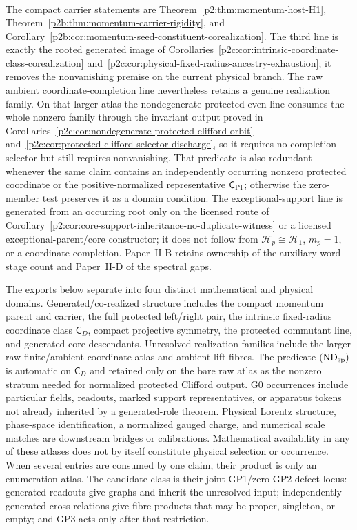 \documentclass[12pt,a4paper]{article}
\begin{document}
\begin{remark}
\[\begin{gathered}
\end{gathered}
\]
The compact carrier statements are Theorem~\ref{p2:thm:momentum-host-H1},
Theorem~\ref{p2b:thm:momentum-carrier-rigidity}, and
Corollary~\ref{p2b:cor:momentum-seed-constituent-corealization}.  The third
line is exactly the rooted generated image of
Corollaries~\ref{p2c:cor:intrinsic-coordinate-class-corealization}
and~\ref{p2c:cor:physical-fixed-radius-ancestry-exhaustion}; it removes the
nonvanishing premise on the current physical branch.  The raw ambient
coordinate-completion line nevertheless retains a genuine realization family.
On that larger atlas the nondegenerate protected-even line consumes the whole
nonzero family through the invariant output proved in
Corollaries~\ref{p2c:cor:nondegenerate-protected-clifford-orbit}
and~\ref{p2c:cor:protected-clifford-selector-discharge}, so it requires no
completion selector but still requires nonvanishing.  That predicate is also
redundant whenever the same claim contains an independently occurring nonzero
protected coordinate or the positive-normalized representative
\(\mathsf C_{\rm PI}\); otherwise the zero-member test preserves it as a
domain condition.  The exceptional-support line is generated from an occurring
root only on the licensed route of
Corollary~\ref{p2:cor:core-support-inheritance-no-duplicate-witness} or a
licensed exceptional-parent/core constructor; it does not follow from
\(\mathcal H_p\cong\mathcal H_1\), \(m_p=1\), or a coordinate completion.
Paper~II-B retains ownership of the auxiliary word-stage count and Paper~II-D
of the spectral gaps.
\end{remark}

\begin{remark}
The exports below separate into four distinct mathematical and
physical domains.  Generated/co-realized structure includes the compact momentum
parent and carrier, the full protected left/right pair, the intrinsic
fixed-radius coordinate class \(\mathsf C_D\), compact projective symmetry,
the protected commutant line, and generated core descendants.  Unresolved
realization families include the larger raw finite/ambient coordinate atlas
and ambient-lift fibres.  The predicate \((\mathrm{ND}_{\rm sp})\) is automatic
on \(\mathsf C_D\) and retained only on the bare raw atlas as the nonzero
stratum needed for normalized protected Clifford output.  G0 occurrences
include particular fields, readouts, marked support representatives, or
apparatus tokens not already inherited by a generated-role theorem.  Physical
Lorentz structure, phase-space identification, a normalized gauged charge, and
numerical scale matches are downstream bridges or calibrations.  Mathematical
availability in any of these atlases does not by itself constitute physical
selection or occurrence.  When several entries are consumed by one claim,
their product is only an enumeration atlas.  The candidate class is their
joint GP1/zero-GP2-defect locus: generated readouts give graphs and inherit the
unresolved input; independently generated cross-relations give fibre products
that may be proper, singleton, or empty; and GP3 acts only after that
restriction.
\end{remark}
\end{document}
